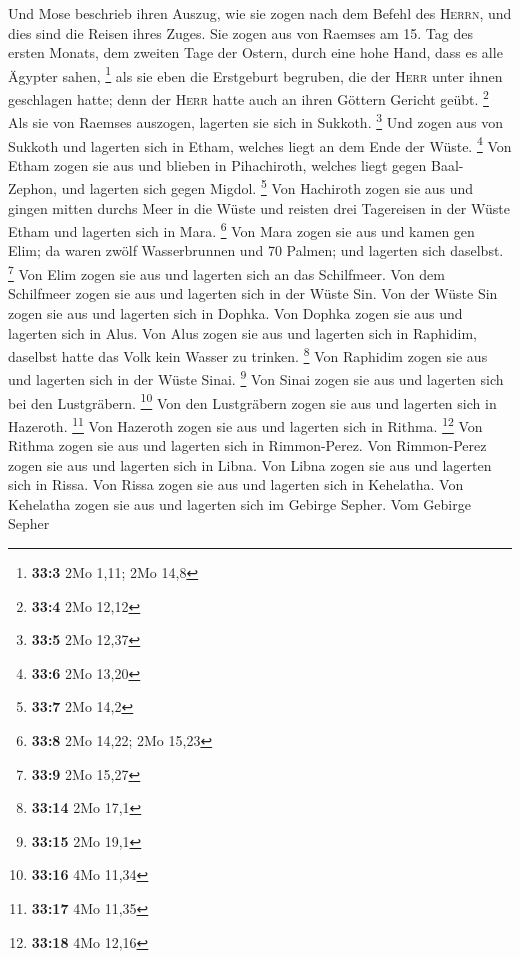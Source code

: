  Und Mose beschrieb ihren Auszug, wie sie zogen nach dem
Befehl des \textsc{Herrn}, und dies sind die Reisen ihres Zuges.
 Sie zogen aus von Raemses am 15. Tag des ersten Monats,
dem zweiten Tage der Ostern, durch eine hohe Hand, dass es alle Ägypter
sahen, \footnote{\textbf{33:3} 2Mo 1,11; 2Mo 14,8}  als
sie eben die Erstgeburt begruben, die der \textsc{Herr} unter ihnen
geschlagen hatte; denn der \textsc{Herr} hatte auch an ihren Göttern
Gericht geübt. \footnote{\textbf{33:4} 2Mo 12,12}  Als sie
von Raemses auszogen, lagerten sie sich in Sukkoth. \footnote{\textbf{33:5}
  2Mo 12,37}  Und zogen aus von Sukkoth und lagerten sich
in Etham, welches liegt an dem Ende der Wüste. \footnote{\textbf{33:6}
  2Mo 13,20}  Von Etham zogen sie aus und blieben in
Pihachiroth, welches liegt gegen Baal-Zephon, und lagerten sich gegen
Migdol. \footnote{\textbf{33:7} 2Mo 14,2}  Von Hachiroth
zogen sie aus und gingen mitten durchs Meer in die Wüste und reisten
drei Tagereisen in der Wüste Etham und lagerten sich in Mara.
\footnote{\textbf{33:8} 2Mo 14,22; 2Mo 15,23}  Von Mara
zogen sie aus und kamen gen Elim; da waren zwölf Wasserbrunnen und 70
Palmen; und lagerten sich daselbst. \footnote{\textbf{33:9} 2Mo 15,27}
 Von Elim zogen sie aus und lagerten sich an das
Schilfmeer.  Von dem Schilfmeer zogen sie aus und
lagerten sich in der Wüste Sin.  Von der Wüste Sin zogen
sie aus und lagerten sich in Dophka.  Von Dophka zogen
sie aus und lagerten sich in Alus.  Von Alus zogen sie
aus und lagerten sich in Raphidim, daselbst hatte das Volk kein Wasser
zu trinken. \footnote{\textbf{33:14} 2Mo 17,1}  Von
Raphidim zogen sie aus und lagerten sich in der Wüste Sinai. \footnote{\textbf{33:15}
  2Mo 19,1}  Von Sinai zogen sie aus und lagerten sich
bei den Lustgräbern. \footnote{\textbf{33:16} 4Mo 11,34} 
Von den Lustgräbern zogen sie aus und lagerten sich in Hazeroth.
\footnote{\textbf{33:17} 4Mo 11,35}  Von Hazeroth zogen
sie aus und lagerten sich in Rithma. \footnote{\textbf{33:18} 4Mo 12,16}
 Von Rithma zogen sie aus und lagerten sich in
Rimmon-Perez.  Von Rimmon-Perez zogen sie aus und
lagerten sich in Libna.  Von Libna zogen sie aus und
lagerten sich in Rissa.  Von Rissa zogen sie aus und
lagerten sich in Kehelatha.  Von Kehelatha zogen sie aus
und lagerten sich im Gebirge Sepher.  Vom Gebirge Sepher
